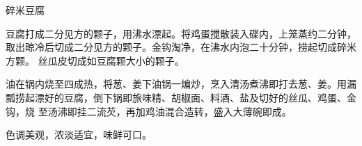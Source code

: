 %
%
%
%
%
%
%
\begin{recipe}{碎米豆腐}

\ingredients


\preparation

\step 豆腐打成二分见方的颗子，用沸水漂起。将鸡蛋搅散装入碟内，上笼蒸约二分钟，
取出晾冷后切成二分见方的颗子。金钩淘净，在沸水内泡二十分钟，捞起切成碎米方颗。
丝瓜皮切成如豆腐颗大小的颗子。

\step 油在锅内烧至四成热，将葱、姜下油锅一煸炒，烹入清汤煮沸即打去葱、姜。用漏
瓢捞起漂好的豆腐，倒下锅即旅味精、胡椒面、料酒、盐及切好的丝瓜、鸡蛋、金钩，烧
至汤沸即挂二流芡，再加鸡油混合造转，盛入大薄碗即成。

\features

色调美观，浓淡适宜，味鲜可口。

\end{recipe}

